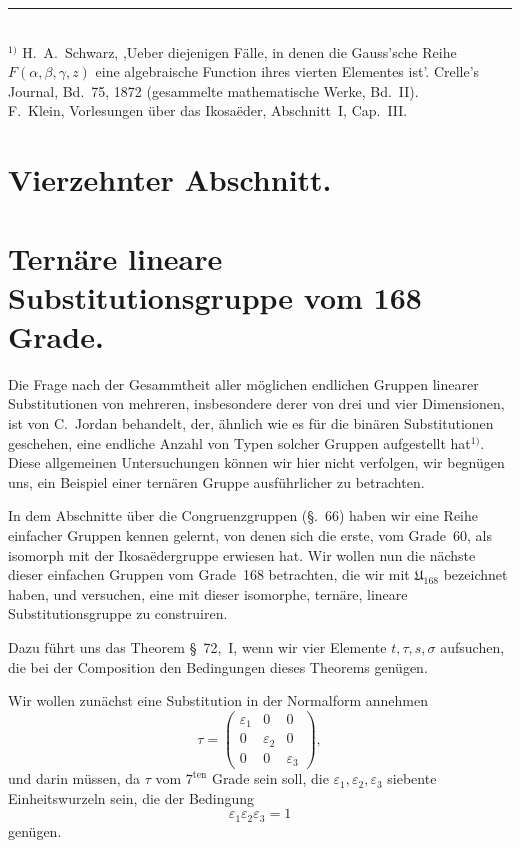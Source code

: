\documentclass[12pt,a4paper]{article}
\begin{document}
\vspace{1em}
\noindent\rule{0.3\textwidth}{0.4pt}\\[0.3em]
{\small
$^{1)}$ H.~A.~Schwarz, ,Ueber diejenigen F\"alle, in denen die Gauss'sche Reihe $F(\alpha, \beta, \gamma, z)$ eine algebraische Function ihres vierten Elementes ist'. Crelle's Journal, Bd.~75, 1872 (gesammelte mathematische Werke, Bd.~II).\\
F.~Klein, Vorlesungen \"uber das Ikosa\"eder, Abschnitt~I, Cap.~III.
}

\newpage

\newpage
\section*{Vierzehnter Abschnitt.}

\section{Tern\"are lineare Substitutionsgruppe vom 168 Grade.}
\label{sec:115}

Die Frage nach der Gesammtheit aller m\"oglichen endlichen Gruppen linearer Substitutionen von mehreren, insbesondere derer von drei und vier Dimensionen, ist von C.~Jordan behandelt, der, \"ahnlich wie es f\"ur die bin\"aren Substitutionen geschehen, eine endliche Anzahl von Typen solcher Gruppen aufgestellt hat$^{1)}$. Diese allgemeinen Untersuchungen k\"onnen wir hier nicht verfolgen, wir begn\"ugen uns, ein Beispiel einer tern\"aren Gruppe ausf\"uhrlicher zu betrachten.

In dem Abschnitte \"uber die Congruenzgruppen (\S.~66) haben wir eine Reihe einfacher Gruppen kennen gelernt, von denen sich die erste, vom Grade~60, als isomorph mit der Ikosa\"edergruppe erwiesen hat. Wir wollen nun die n\"achste dieser einfachen Gruppen vom Grade~168 betrachten, die wir mit $\mathfrak{U}_{168}$ bezeichnet haben, und versuchen, eine mit dieser isomorphe, tern\"are, lineare Substitutionsgruppe zu construiren.

Dazu f\"uhrt uns das Theorem \S~72,~I, wenn wir vier Elemente $t, \tau, s, \sigma$ aufsuchen, die bei der Composition den Bedingungen dieses Theorems gen\"ugen.

Wir wollen zun\"achst eine Substitution in der Normalform annehmen
\begin{equation}
\label{eq:tau} \tau = \begin{pmatrix} \varepsilon_1 & 0 & 0 \\ 0 & \varepsilon_2 & 0 \\ 0 & 0 & \varepsilon_3 \end{pmatrix},
\end{equation}
und darin m\"ussen, da $\tau$ vom $7^{\text{ten}}$ Grade sein soll, die $\varepsilon_1, \varepsilon_2, \varepsilon_3$ siebente Einheitswurzeln sein, die der Bedingung
\begin{equation}
\label{eq:bed1} \varepsilon_1 \varepsilon_2 \varepsilon_3 = 1
\end{equation}
gen\"ugen.
\end{document}
